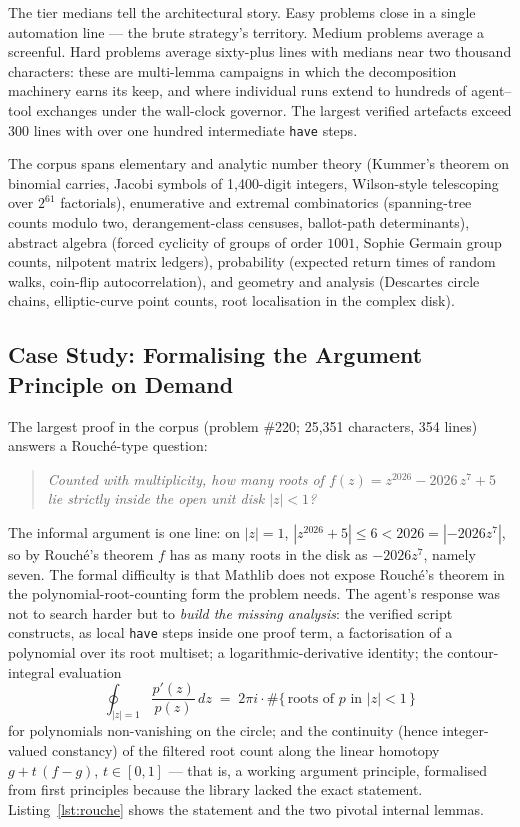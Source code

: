 \documentclass[12pt, a4paper]{article}
\begin{document}
The tier medians tell the architectural story. Easy problems close in a
single automation line --- the brute strategy's territory. Medium problems
average a screenful. Hard problems average sixty-plus lines with medians
near two thousand characters: these are multi-lemma campaigns in which the
decomposition machinery earns its keep, and where individual runs extend to
hundreds of agent--tool exchanges under the wall-clock governor. The largest
verified artefacts exceed 300 lines with over one hundred intermediate
\texttt{have} steps.

The corpus spans elementary and analytic number theory (Kummer's theorem on
binomial carries, Jacobi symbols of 1{,}400-digit integers, Wilson-style
telescoping over $2^{61}$ factorials), enumerative and extremal
combinatorics (spanning-tree counts modulo two, derangement-class censuses,
ballot-path determinants), abstract algebra (forced cyclicity of groups of
order $1001$, Sophie Germain group counts, nilpotent matrix ledgers),
probability (expected return times of random walks, coin-flip
autocorrelation), and geometry and analysis (Descartes circle chains,
elliptic-curve point counts, root localisation in the complex disk).

\subsection{Case Study: Formalising the Argument Principle on Demand}

The largest proof in the corpus (problem \#220; 25{,}351 characters,
354 lines) answers a Rouch\'e-type question:

\begin{quote}
  \emph{Counted with multiplicity, how many roots of
  $f(z) = z^{2026} - 2026\,z^{7} + 5$ lie strictly inside the open unit
  disk $|z| < 1$?}
\end{quote}

The informal argument is one line: on $|z|=1$,
$|z^{2026} + 5| \le 6 < 2026 = |{-2026 z^7}|$, so by Rouch\'e's theorem $f$
has as many roots in the disk as $-2026z^7$, namely seven. The formal
difficulty is that Mathlib does not expose Rouch\'e's theorem in the
polynomial-root-counting form the problem needs. The agent's response was
not to search harder but to \emph{build the missing analysis}: the verified
script constructs, as local \texttt{have} steps inside one proof term, a
factorisation of a polynomial over its root multiset; a logarithmic-derivative
identity; the contour-integral evaluation
\[
  \oint_{|z|=1} \frac{p'(z)}{p(z)}\,dz \;=\; 2\pi i \cdot
  \#\{\,\text{roots of } p \text{ in } |z|<1\,\}
\]
for polynomials non-vanishing on the circle; and the continuity (hence
integer-valued constancy) of the filtered root count along the linear
homotopy $g + t\,(f - g)$, $t \in [0,1]$ --- that is, a working argument
principle, formalised from first principles because the library lacked the
exact statement. Listing~\ref{lst:rouche} shows the statement and the two
pivotal internal lemmas.
\end{document}
